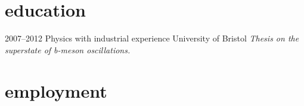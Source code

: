 \documentclass[]{friggeri-cv} %
\begin{document}
\section{education}

\begin{entrylist}
\entry
{2007--2012}
{Physics {\normalfont with industrial experience}}
{University of Bristol}
{\emph{Thesis on the superstate of b-meson oscillations.} }
\end{entrylist}


\section{employment}
\end{document}
